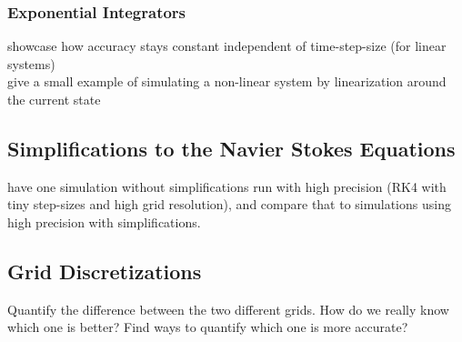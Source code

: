 \subsubsection{Exponential Integrators}
showcase how accuracy stays constant independent of time-step-size (for linear systems)\\
give a small example of simulating a non-linear system by linearization around the current state

\subsection{Simplifications to the Navier Stokes Equations} %
have one simulation without simplifications run with high precision (RK4 with tiny step-sizes and high grid resolution), and compare that to simulations using high precision with simplifications.

\subsection{Grid Discretizations}%
Quantify the difference between the two different grids.
How do we really know which one is better?
Find ways to quantify which one is more accurate?